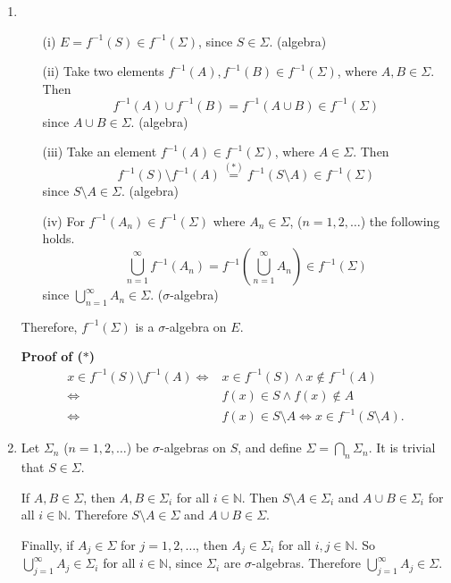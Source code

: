 \documentclass[12pt]{report}
\newcommand{\numl}[1]{\item[\large\textbf{\sffamily #1.}]}
\newcommand{\inv}{^{-1}}
\newcommand{\bs}{\setminus}
\newcommand{\paren}[1]{\left( #1 \right)}
\newcommand{\mast}{\(\ast\)}
\newcommand{\N}{\mathbb{N}}
\begin{document}
\begin{enumerate}
    \numl{2}
    \begin{enumerate}
        \item[(i)] \(E = f\inv(S) \in f\inv(\Sigma)\), since \(S \in \Sigma\). (algebra)
        \item[(ii)] Take two elements \(f\inv(A), f\inv(B) \in f\inv(\Sigma)\), where \(A, B \in \Sigma\). Then
            \[
                f\inv(A) \cup f\inv(B) = f\inv(A \cup B) \in f\inv(\Sigma)
            \]
            since \(A \cup B \in \Sigma\). (algebra)
        \item[(iii)] Take an element \(f\inv(A) \in f\inv(\Sigma)\), where \(A \in \Sigma\). Then
            \[
                f\inv(S) \bs f\inv(A) \overset{(\ast)}{=} f\inv\paren{S \bs A} \in f\inv(\Sigma)
            \]
            since \(S \bs A \in \Sigma\). (algebra)
        \item[(iv)] For \(f\inv(A_n) \in f\inv(\Sigma)\) where \(A_n \in \Sigma\), (\(n = 1, 2, \dots\)) the following holds.
            \[
                \bigcup_{n=1}^\infty f\inv(A_n) = f\inv\paren{\bigcup_{n=1}^\infty A_n} \in f\inv(\Sigma)
            \]
            since \(\bigcup_{n=1}^\infty A_n \in \Sigma\). (\(\sigma\)-algebra)
    \end{enumerate}

    Therefore, \(f\inv(\Sigma)\) is a \(\sigma\)-algebra on \(E\).

        {\sffamily \bfseries Proof of (\mast)}
    \[
        \begin{aligned}
            x \in f\inv(S) \bs f\inv(A) \iff & x \in f\inv(S) \land x \notin f\inv(A)           \\
            \iff                             & f(x) \in S \land f(x) \notin A                   \\
            \iff                             & f(x) \in S\bs A \iff x \in f\inv\paren{S \bs A}.
        \end{aligned}
    \]

    \numl{3} Let \(\Sigma_n\) (\(n = 1, 2, \dots\)) be \(\sigma\)-algebras on \(S\), and define \(\Sigma = \bigcap_{n} \Sigma_n\). It is trivial that \(S \in \Sigma\).

    If \(A, B \in \Sigma\), then \(A, B \in \Sigma_i\) for all \(i \in \N\). Then \(S \bs A \in \Sigma_i\) and \(A \cup B \in \Sigma_i\) for all \(i \in \N\). Therefore \(S\bs A \in \Sigma\) and \(A \cup B \in \Sigma\).

    Finally, if \(A_j \in \Sigma\) for \(j = 1, 2, \dots\), then \(A_j \in \Sigma_i\) for all \(i, j \in \N\). So \(\bigcup_{j=1}^\infty A_j \in \Sigma_i\) for all \(i \in \N\), since \(\Sigma_i\) are \(\sigma\)-algebras. Therefore \(\bigcup_{j=1}^\infty A_j \in \Sigma\).


\end{enumerate}
\end{document}
